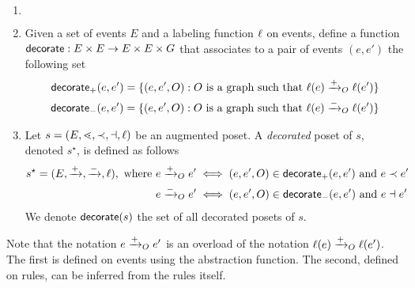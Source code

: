 \begin{definition}
  \label{def:decorate_poset}
  \begin{enumerate}
  \item[] $~$
  \item Given a set of events $E$ and a labeling function $\ell$ on events, define a function $\mathsf{decorate}:E\times E \to E\times E\times G$ that associates to a pair of events $(e,e')$ the following set
    \begin{align*}
      \mathsf{decorate}_{+}(e,e') = \{(e,e',O) : O\text{ is a graph such that }\ell(e)\mathrel{\xrightarrow{+}}_O \ell(e')\}\\
       \mathsf{decorate}_{-}(e,e') = \{(e,e',O) : O\text{ is a graph such that }\ell(e)\mathrel{\xrightarrow{-}}_O \ell(e')\}
    \end{align*}

  \item Let $s = (E,\lessdot,\prec,\dashv,\ell)$ be an augmented poset. A \emph{decorated} poset of $s$, denoted $s^{\star}$, is defined as follows
    \begin{align*}
      s^{\star} = (E,\mathrel{\xrightarrow{+}},\mathrel{\xrightarrow{-}},\ell), \text{ where }
      &e\mathrel{\xrightarrow{+}}_O e' \iff (e,e',O)\in\mathsf{decorate}_+(e,e')\text{ and }e\prec e'\\
      &e\mathrel{\xrightarrow{-}}_O e' \iff (e,e',O)\in\mathsf{decorate}_-(e,e')\text{ and }e\dashv e'\\
    \end{align*}
    We denote $\mathsf{decorate}(s)$ the set of all decorated posets of $s$.
  \end{enumerate}
\end{definition}

Note that the notation $e\mathrel{\xrightarrow{+}}_O e'$ is an overload of the notation $\ell(e)\mathrel{\xrightarrow{+}}_O \ell(e')$. The first is defined on events using the abstraction function. The second, defined on rules, can be inferred from the rules itself.

